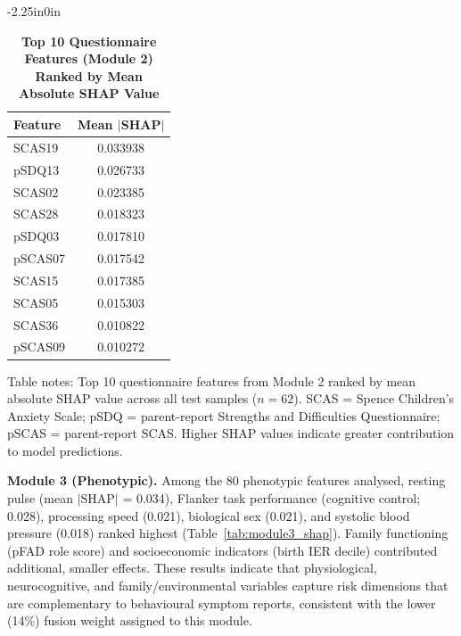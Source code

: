 \documentclass[10pt,letterpaper]{article}
\newcommand{\hlpar}[1]{\leavevmode\colorbox{yellow!30}{\parbox{\dimexpr\linewidth-2\fboxsep\relax}{#1}}\vspace{2pt}}
\begin{document}
\begin{table}[!t]
\begin{adjustwidth}{-2.25in}{0in}
\centering
\caption{\textbf{Top 10 Questionnaire Features (Module 2) Ranked by Mean Absolute SHAP Value}}
\label{tab:module2_shap}
\footnotesize
\renewcommand{\arraystretch}{1.3}

\begin{tabular}{|l|c|}
\hline
\textbf{Feature} & \textbf{Mean $|$SHAP$|$} \\
\hline
SCAS19 & 0.033938 \\
\hline
pSDQ13 & 0.026733 \\
\hline
SCAS02 & 0.023385 \\
\hline
SCAS28 & 0.018323 \\
\hline
pSDQ03 & 0.017810 \\
\hline
pSCAS07 & 0.017542 \\
\hline
SCAS15 & 0.017385 \\
\hline
SCAS05 & 0.015303 \\
\hline
SCAS36 & 0.010822 \\
\hline
pSCAS09 & 0.010272 \\
\hline
\end{tabular}

\begin{flushleft}
Table notes: Top 10 questionnaire features from Module 2 ranked by mean absolute SHAP value across all test samples ($n=62$). SCAS = Spence Children's Anxiety Scale; pSDQ = parent-report Strengths and Difficulties Questionnaire; pSCAS = parent-report SCAS. Higher SHAP values indicate greater contribution to model predictions.
\end{flushleft}
\end{adjustwidth}
\end{table}

\hlpar{\textbf{Module 3 (Phenotypic).} Among the 80 phenotypic features analysed, resting pulse (mean $|\mathrm{SHAP}|$ = 0.034), Flanker task performance (cognitive control; 0.028), processing speed (0.021), biological sex (0.021), and systolic blood pressure (0.018) ranked highest (Table~\ref{tab:module3_shap}). Family functioning (pFAD role score) and socioeconomic indicators (birth IER decile) contributed additional, smaller effects. These results indicate that physiological, neurocognitive, and family/environmental variables capture risk dimensions that are complementary to behavioural symptom reports, consistent with the lower (14\%) fusion weight assigned to this module.}
\end{document}
